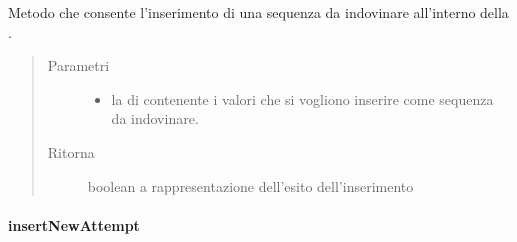 \documentclass[letterpaper,10pt,italian,openany,oneside]{sphinxmanual}
\begin{document}
\begin{fulllineitems}
\label{\detokenize{test/it/unicam/cs/pa/mastermind/gamecore/BoardController:it.unicam.cs.pa.mastermind.gamecore.BoardController.insertCodeToGuess(List)}}
Metodo che consente l’inserimento di una sequenza da indovinare all’interno della .
\begin{quote}\begin{description}
\item[{Parametri}] \leavevmode\begin{itemize}
\item {} 
 \textendash{} la  di  contenente i valori che si vogliono inserire come sequenza da indovinare.

\end{itemize}

\item[{Ritorna}] \leavevmode
boolean a rappresentazione dell’esito dell’inserimento

\end{description}\end{quote}

\end{fulllineitems}



\paragraph{insertNewAttempt}
\label{\detokenize{test/it/unicam/cs/pa/mastermind/gamecore/BoardController:insertnewattempt}}
\end{document}
